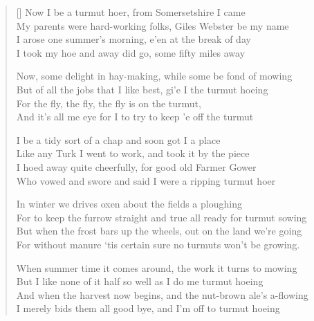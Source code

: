 \pagebreak
\settowidth{\versewidth}{But of all the jobs that I like best, gi'e I the turmut hoeing}
\begin{verse}[\versewidth]
Now I be a turmut hoer, from Somersetshire I came\\
My parents were hard-working folks, Giles Webster be my name\\
I arose one summer's morning, e'en at the break of day\\
I took my hoe and away did go, some fifty miles away

\begin{chorus}
Now, some delight in hay-making, while some be fond of mowing\\
But of all the jobs that I like best, gi'e I the turmut hoeing\\
For the fly, the fly, the fly is on the turmut,\\
And it's all me eye for I to try to keep 'e off the turmut
\end{chorus}

I be a tidy sort of a chap and soon got I a place\\
Like any Turk I went to work, and took it by the piece\\
I hoed away quite cheerfully, for good old Farmer Gower\\
Who vowed and swore and said I were a ripping turmut hoer

In winter we drives oxen about the fields a ploughing\\
For to keep the furrow straight and true all ready for turmut sowing\\
But when the frost bars up the wheels, out on the land we're going\\
For without manure `tis certain sure no turmuts won't be growing.

When summer time it comes around, the work it turns to mowing\\
But I like none of it half so well as I do me turmut hoeing\\
And when the harvest now begins, and the nut-brown ale's a-flowing\\
I merely bids them all good bye, and I'm off to turmut hoeing
\end{verse}
